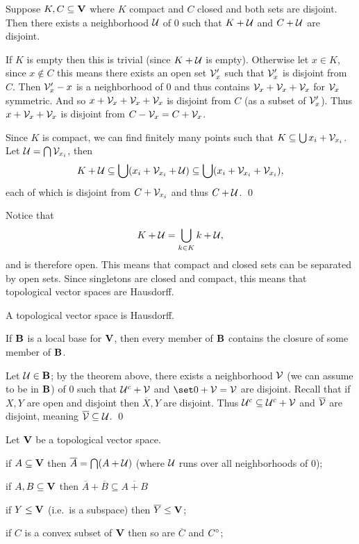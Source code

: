 \bthrm

    Suppose $K,C\subseteq {\bf V}$ where $K$ compact and $C$ closed and both sets are disjoint.
    Then there exists a neighborhood ${\cal U}$ of $0$ such that $K+{\cal U}$ and $C+{\cal U}$ are disjoint.

\ethrm

\bproof

    If $K$ is empty then this is trivial (since $K+{\cal U}$ is empty).
    Otherwise let $x\in K$, since $x\notin C$ this means there exists an open set ${\cal V}'_x$ such that ${\cal V}'_x$ is disjoint from $C$.
    Then ${\cal V}'_x-x$ is a neighborhood of $0$ and thus contains ${\cal V}_x+{\cal V}_x+{\cal V}_x$ for ${\cal V}_x$ symmetric.
    And so $x+{\cal V}_x+{\cal V}_x+{\cal V}_x$ is disjoint from $C$ (as a subset of ${\cal V}'_x$).
    Thus $x+{\cal V}_x+{\cal V}_x$ is disjoint from $C-{\cal V}_x=C+{\cal V}_x$.

    Since $K$ is compact, we can find finitely many points such that $K\subseteq\bigcup x_i+{\cal V}_{x_i}$.
    Let ${\cal U}=\bigcap{\cal V}_{x_i}$, then
    $$ K+{\cal U} \subseteq \bigcup (x_i+{\cal V}_{x_i}+{\cal U}) \subseteq \bigcup (x_i+{\cal V}_{x_i}+{\cal V}_{x_i}) , $$
    each of which is disjoint from $C+{\cal V}_{x_i}$ and thus $C+{\cal U}$.
    \qed

\eproof

Notice that
$$ K+{\cal U} = \bigcup_{k\in K}k+{\cal U} , $$
and is therefore open.
This means that compact and closed sets can be separated by open sets.
Since singletons are closed and compact, this means that topological vector spaces are Hausdorff.

\bthrm

    A topological vector space is Hausdorff.

\ethrm

\bthrm

    If ${\bf B}$ is a local base for ${\bf V}$, then every member of ${\bf B}$ contains the closure of some member of ${\bf B}$.

\ethrm

\bproof

    Let ${\cal U}\in{\bf B}$; by the theorem above, there exists a neighborhood ${\cal V}$ (we can assume to be in ${\bf B}$) of $0$ such that ${\cal U}^c+{\cal V}$ and $\set0+\V=\V$ are disjoint.
    Recall that if $X,Y$ are open and disjoint then $\overline X,Y$ are disjoint.
    Thus ${\cal U}^c\subseteq{\cal U}^c+{\cal V}$ and $\overline{{\cal V}}$ are disjoint, meaning $\overline{{\cal V}}\subseteq{\cal U}$.
    \qed

\eproof

\bprop

    Let ${\bf V}$ be a topological vector space.
    \benum
        \item if $A\subseteq {\bf V}$ then $\overline A=\bigcap(A+{\cal U})$ (where ${\cal U}$ runs over all neighborhoods of $0$);
        \item if $A,B\subseteq {\bf V}$ then $\overline A+\overline B\subseteq\overline{A+B}$
        \item if $Y\leq {\bf V}$ (i.e.\ is a subspace) then $\overline Y\leq{\bf V}$;
        \item if $C$ is a convex subset of ${\bf V}$ then so are $\overline C$ and $C^{\circ}$;
    \eenum

